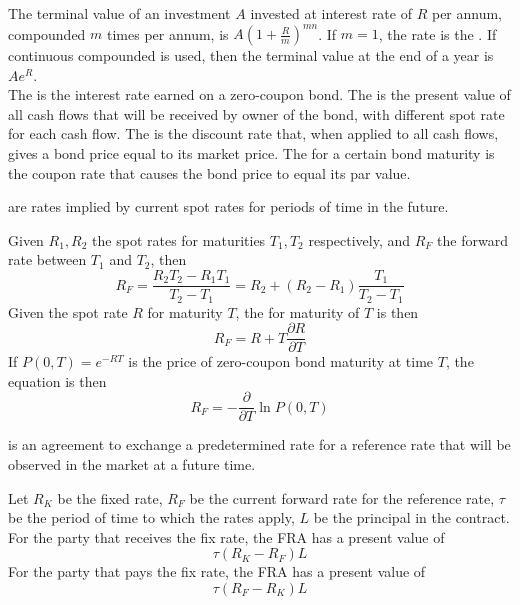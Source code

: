 The terminal value of an investment $A$ invested at interest rate of $R$ per annum, compounded $m$ times per annum, is $A(1+\frac{R}{m})^{mn}$. If $m=1$, the rate is the . If continuous compounded is used, then  the terminal value at the end of a year is $Ae^{R}$.\\

The  is the interest rate earned on a zero-coupon bond. The  is the present value of all cash flows that will be received by owner of the bond, with different spot rate for each cash flow. The  is the discount rate that, when applied to all cash flows, gives a bond price equal to its market price. The  for a certain bond maturity is the coupon rate that causes the bond price to equal its par value.\\

\begin{definition}
 are rates implied by current spot rates for periods of time in the future.
\end{definition}

Given $R_1, R_2$ the spot rates for maturities $T_1, T_2$ respectively, and $R_F$ the forward rate between $T_1$ and $T_2$, then
\begin{equation*}
R_F = \frac{R_2 T_2 - R_1 T_1}{T_2 - T_1}=R_2 + (R_2 - R_1)\frac{T_1}{T_2 - T_1} \nonumber
\end{equation*}
Given the spot rate $R$ for maturity $T$, the  for maturity of $T$ is then
\begin{equation*}
R_F = R + T \frac{\partial R}{\partial T} \nonumber
\end{equation*}
If $P(0,T) = e^{-RT}$ is the price of zero-coupon bond maturity at time $T$, the equation is then
\begin{equation*}
R_F = -\frac{\partial}{\partial T} \ln P(0,T) \nonumber
\end{equation*}

\begin{definition}
 is an agreement to exchange a predetermined rate for a reference rate that will be observed in the market at a future time.
\end{definition}

Let $R_K$ be the fixed rate, $R_F$ be the current forward rate for the reference rate, $\tau$ be the period of time to which the rates apply, $L$ be the principal in the contract.\\
For the party that receives the fix rate, the FRA has a present value of 
\begin{equation*}
\tau (R_K - R_F)L \nonumber
\end{equation*}
For the party that pays the fix rate, the FRA has a present value of
\begin{equation*}
\tau (R_F - R_K)L \nonumber
\end{equation*}

